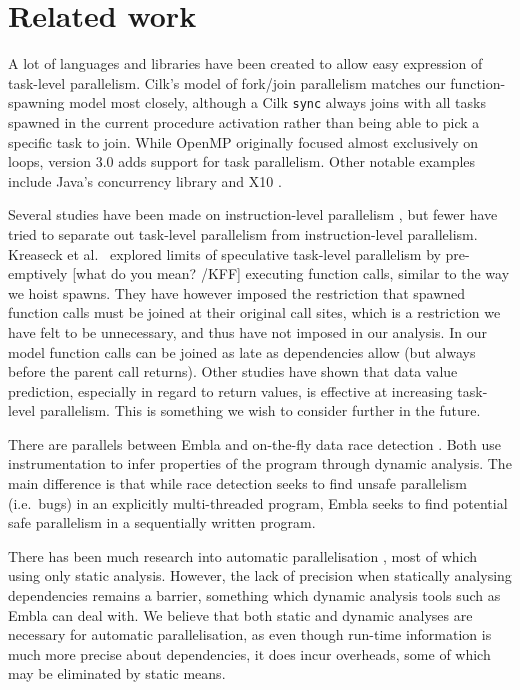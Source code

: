 \section{Related work}

A lot of languages and libraries have been created to allow easy
expression of task-level parallelism.  Cilk's \cite{blumofe96cilk}
model of fork/join parallelism matches our function-spawning model
most closely, although a Cilk {\tt sync} always joins with all tasks 
spawned in the current procedure activation rather than being able to 
pick a specific task to join. While OpenMP \cite{dagum98openmp} 
originally focused almost exclusively on loops, version 3.0 adds 
support for task parallelism.  Other notable examples
include Java's concurrency library \cite{lea00java} and X10
\cite{charles05x10}.

Several studies have been made on instruction-level parallelism
\cite{wall91limits, postiff99limits, austin92dynamic, lam92limits,
mak09limits}, but fewer have tried to separate out task-level
parallelism from instruction-level parallelism.  Kreaseck et al.\
\cite{Kreaseck00limitsof} explored limits of speculative task-level
parallelism by pre-emptively [what do you mean? /KFF] 
executing function calls, similar to the
way we hoist spawns.  They have however imposed the restriction that
spawned function calls must be joined at their original call sites,
which is a restriction we have felt to be unnecessary, and thus have
not imposed in our analysis.  In our model function calls can be
joined as late as dependencies allow (but always before the parent
call returns).  Other studies \cite{warg01limits, oplinger99insearch}
have shown that data value prediction, especially in regard to return
values, is effective at increasing task-level parallelism.  This is
something we wish to consider further in the future.

There are parallels between Embla and on-the-fly data race detection
\cite{MellorCrummey91onthefly, ha02space, savage97eraser}.  Both use
instrumentation to infer properties of the program through dynamic
analysis.  The main difference is that while race detection seeks to
find unsafe parallelism (i.e.\ bugs) in an explicitly multi-threaded
program, Embla seeks to find potential safe parallelism in a
sequentially written program.

There has been much research into automatic parallelisation
\cite{kennedy02optimizing, Blume94polaris, ottoni05automatic,
ottoni07global}, most of which using only static analysis.  However,
the lack of precision when statically analysing dependencies remains a
barrier, something which dynamic analysis tools such as Embla can deal
with.  We believe that both static and dynamic analyses are necessary
for automatic parallelisation, as even though run-time information is
much more precise about dependencies, it does incur overheads, some of
which may be eliminated by static means.

